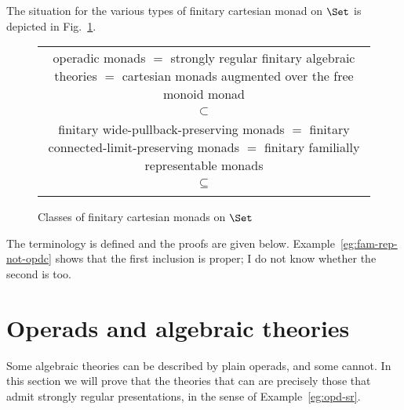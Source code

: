 The situation for the various types of finitary cartesian monad on $\Set$ is
depicted in Fig.~\ref{fig:cart-monads}.
%
\begin{figure}
\begin{tabular}{c}
\fbox{\parbox{.9\textwidth}{operadic monads\\
$=$ strongly regular finitary algebraic theories\\
$=$ cartesian monads augmented over the free monoid monad}}\\
$\subset$\\
\fbox{\parbox{.9\textwidth}{finitary wide-pullback-preserving monads\\
$=$ finitary connected-limit-preserving monads\\
$=$ finitary familially representable monads}}\\
$\subseteq$\\
\fbox{\parbox{.9\textwidth}{finitary cartesian monads}}
\end{tabular}
\caption{Classes of finitary cartesian monads on $\Set$}
\label{fig:cart-monads}
\end{figure}
%
The terminology is defined and the proofs are given below.
Example~\ref{eg:fam-rep-not-opdc} shows that the first inclusion is proper;
I do not know whether the second is too.







\section{Operads and algebraic theories}
%
%
%
%


Some algebraic theories can be described by plain operads, and some cannot.
In this section we will prove that the theories that can are precisely
those that admit strongly regular presentations, in the sense of
Example~\ref{eg:opd-sr}.

